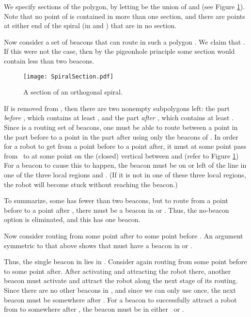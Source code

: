 \documentclass{article}
\begin{document}
We specify  sections  of the polygon, by letting
 be the union of  and  (see Figure \ref{fig:spiralSection}).
Note that no point of  is contained in more than one section, and there
are points at either end of the spiral (in  and )
that are in no section.

Now consider a set of beacons  that can route in such a polygon .
We claim that .
If this were not the case, then by the pigeonhole principle some section 
would contain less than two beacons.

\begin{figure}[htb] 
	\begin{center}
		\texttt{[image: SpiralSection.pdf]} 
	\end{center}
	\caption{ A section of an orthogonal spiral. }
	\label{fig:spiralSection}
\end{figure}

If  is removed from , then there are two nonempty subpolygons left:
the part \emph{before} , which contains at least ,
and the part \emph{after} , which contains at least .
Since  is a routing set of beacons, one must be able to route between
a point in the part before  to a point in the part after  using only
the beacons of .
In order for a robot to get from a point before  to a point after,
it must at some point pass from \ to  at some
point on the (closed) vertical between  and  (refer to
Figure \ref{fig:spiralSection})
 For a beacon to cause this to happen, the beacon must be on or left of the
 line  in one of the three local regions 
 and . (If it is not in one of these three local regions, the robot 
 will become stuck without reaching the beacon.)

To summarize, some  has fewer than two beacons, but to route from a point
before  to a point after , there must be a beacon in 
 or .  Thus, the no-beacon option is eliminated, and this  has
 one beacon.  
 
Now consider routing from some point after  to some point before .
An argument symmetric to that above shows that  must have a beacon in
 or .

Thus, the single beacon  in  lies in .
Consider again routing from some point before  to some point after.
After activating  and attracting the robot there, another beacon must
activate and attract the robot along the next stage of its routing.
Since there are no other beacons in , and since we can only use 
once, the next beacon must be somewhere after .
For a beacon to successfully attract a robot from  to somewhere
after , the beacon must be in either \ or . 
\end{document}
